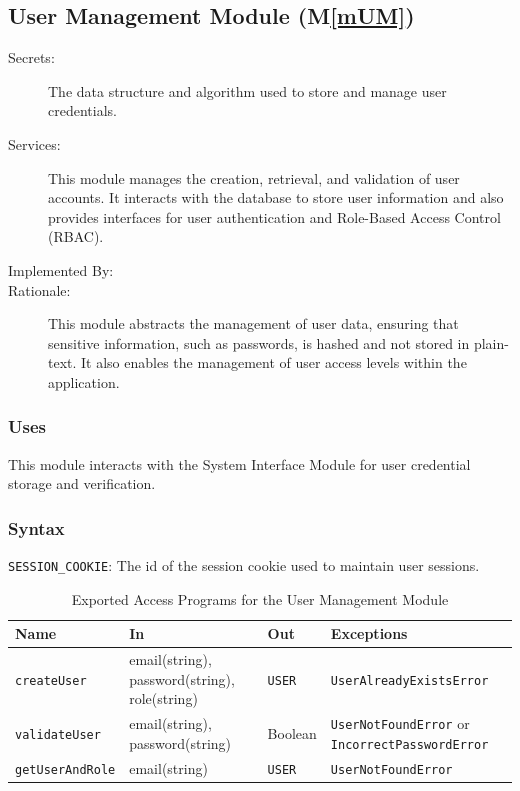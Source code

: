 \documentclass[12pt, titlepage]{article}
\newcommand{\mref}[1]{M\ref{#1}}
\begin{document}
\subsection{User Management Module (\mref{mUM})}
\begin{description}
  \item[Secrets:] The data structure and algorithm used to store and manage user
  credentials.
  \item[Services:]This module manages the creation, retrieval, and validation of
  user accounts. It interacts with the database to store user information and
  also provides interfaces for user authentication and Role-Based Access
  Control (RBAC).
  \item[Implemented By:] \progname{}
  \item[Rationale:] This module abstracts the management of user data, ensuring
  that sensitive information, such as passwords, is hashed and not stored in
  plain-text. It also enables the management of user access levels within the
  application. 
\end{description}

\subsubsection{Uses}
This module interacts with the System Interface Module for user credential
storage and verification.

\subsubsection{Syntax}
\begin{description}
  \item[Exported Constants and Access Programs:]
  \item 
  \texttt{SESSION\_COOKIE}: The id of the session cookie used to maintain user sessions.
  
  \begin{table}[H]
    \centering
    \begin{tabular}{p{} p{} p{}
    p{}}
    \toprule
    \textbf{Name} & \textbf{In} & \textbf{Out} & \textbf{Exceptions}\\
    \midrule
    
    \texttt{createUser} & email(string), password(string), role(string) &
    \texttt{USER} & \texttt{UserAlreadyExistsError} \\
    \midrule
    
    \texttt{validateUser} & email(string), password(string) & Boolean &
    \texttt{UserNotFoundError} or \texttt{IncorrectPasswordError}\\
    \midrule

    \texttt{getUserAndRole} & email(string) & \texttt{USER} &
    \texttt{UserNotFoundError} \\
    \bottomrule

    \end{tabular}
    \caption{Exported Access Programs for the User Management Module}
    \label{TblEAP_UM}
  \end{table}
\end{description}
\end{document}

